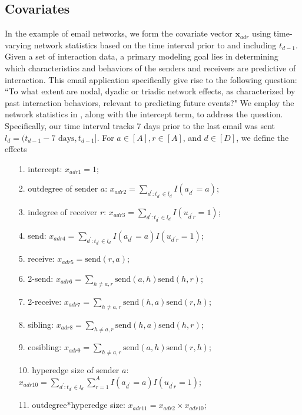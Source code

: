 \documentclass[ba]{imsart}
\numberwithin{equation}{section}
\theoremstyle{plain}
\begin{document}
 	   \subsection{Covariates}\label{subsec:Covariates_email}
 	   In the example of email networks, we form the covariate vector $\boldsymbol{x}_{adr}$ using time-varying network statistics based on the time interval prior to and including $t_{d-1}$. Given a set of interaction data, a primary modeling goal lies in determining which characteristics and behaviors of the senders and receivers are predictive of interaction. This email application specifically give rise to the following question: ``To what extent are nodal, dyadic or triadic network effects, as characterized
 	   by past interaction behaviors, relevant to predicting future events?" We employ the network statistics in \cite{PerryWolfe2012}, along with the intercept term, to address the question. Specifically, our time interval tracks 7 days prior to the last email was sent $l_d = (t_{d-1}-7\mbox{ days}, t_{d-1}]$. For $a \in [A], r \in [A]$, and $d \in [D]$, we define the effects
 	   \begin{itemize}
 	   	\item[1.] intercept: ${x}_{adr1} =1$;
 	   	\item[2.] outdegree of sender $a$: ${x}_{adr2} =\sum_{d^\prime: t_{d^\prime} \in l_d} I(a_{d^\prime} = a)$;
 	   	\item[3.] indegree of receiver $r$: ${x}_{adr3}=\sum_{d^\prime: t_{d^\prime} \in l_d} I(u_{d^\prime r} = 1)$;
 	   	\item[4.] send: ${x}_{adr4}=\sum_{d^\prime: t_{d^\prime} \in l_d} I(a_{d^\prime} = a)I(u_{d^\prime r} = 1)$;
 	   	\item[5.] receive: ${x}_{adr5}=\mbox{send}(r,a)$;
 	   	\item[6.] 2-send: ${x}_{adr6} = \sum_{h \neq a, r} \mbox{send}(a,h)\mbox{send}(h,r)$;
 	   	\item[7.] 2-receive: ${x}_{adr7}= \sum_{h \neq a, r} \mbox{send}(h,a)\mbox{send}(r,h)$;
 	   	\item[8.] sibling: ${x}_{adr8}=\sum_{h \neq a, r} \mbox{send}(h,a)\mbox{send}(h,r)$;
 	   	\item[9.] cosibling: ${x}_{adr9}=\sum_{h \neq a, r} \mbox{send}(a,h)\mbox{send}(r,h)$;
 	   	\item[10.] hyperedge size of sender $a$: ${x}_{adr10}=\sum_{d^\prime: t_{d^\prime} \in l_d} \sum_{r=1}^A I(a_{d^\prime} = a)I(u_{d^\prime r} = 1)$;
 	   	\item[11.] outdegree$*$hyperedge size: ${x}_{adr11} = {x}_{adr2}\times{x}_{adr10};$
 	   \end{itemize}
\end{document}
